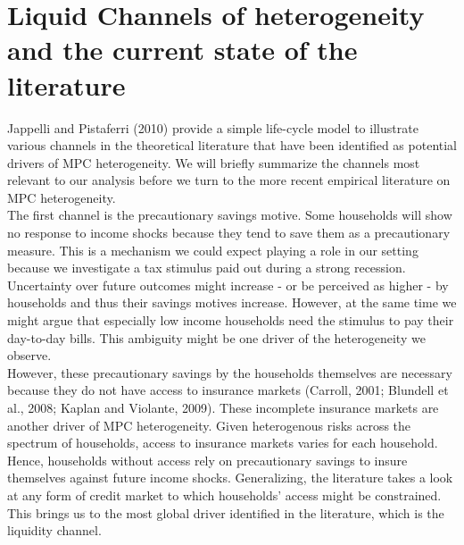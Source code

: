 \section{Liquid Channels of heterogeneity and the current state of the literature} \label{sec:lit}
Jappelli and Pistaferri (2010) provide a simple life-cycle model to illustrate various channels in the theoretical literature that have been identified as potential drivers of MPC heterogeneity. We will briefly summarize the channels most relevant to our analysis before we turn to the more recent empirical literature on MPC heterogeneity. \\
The first channel is the precautionary savings motive. Some households will show no response to income shocks because they tend to save them as a precautionary measure. This is a mechanism we could expect playing a role in our setting because we investigate a tax stimulus paid out during a strong recession. Uncertainty over future outcomes might increase - or be perceived as higher - by households and thus their savings motives increase. However, at the same time we might argue that especially low income households need the stimulus to pay their day-to-day bills. This ambiguity might be one driver of the heterogeneity we observe. \\
However, these precautionary savings by the households themselves are necessary because they do not have access to insurance markets (Carroll, 2001; Blundell et al., 2008; Kaplan and Violante, 2009). These incomplete insurance markets are another driver of MPC heterogeneity. Given heterogenous risks across the spectrum of households, access to insurance markets varies for each household. Hence, households without access rely on precautionary savings to insure themselves against future income shocks. Generalizing, the literature takes a look at any form of credit market to which households' access might be constrained. This brings us to the most global driver identified in the literature, which is the liquidity channel. \\
